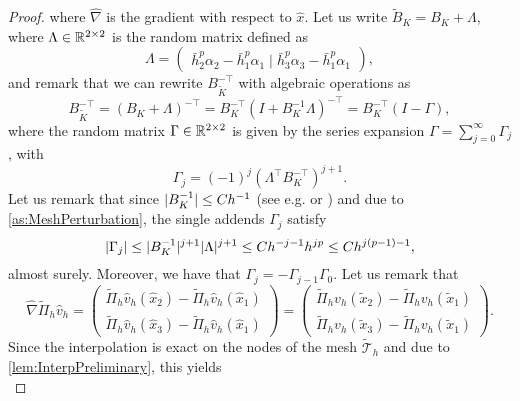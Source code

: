 \begin{proof}
where $\widehat \nabla$ is the gradient with respect to $\hat x$. Let us write $\widetilde B_K = B_K + \Lambda$, where $\Lambda \in \mathbb{R}^{2\times 2}$ is the random matrix defined as
\begin{equation}
	\Lambda = \begin{pmatrix} \bar h_2^p \alpha_2 - \bar h_1^p \alpha_1 \mid \bar h_3^p \alpha_3 - \bar h_1^p \alpha_1 \end{pmatrix},
\end{equation}
and remark that we can rewrite $B_{\widetilde K}^{-\top}$  with algebraic operations as
\begin{equation}
	B_{\widetilde K}^{-\top} = (B_K + \Lambda)^{-\top} = B_K^{-\top}(I + B_K^{-1}\Lambda)^{-\top} = B_K^{-\top}(I - \Gamma),
\end{equation}
where the random matrix $\Gamma\in \mathbb{R}^{2\times 2}$ is given by the series expansion $\Gamma = \sum_{j=0}^\infty \Gamma_j$, with
\begin{equation}
\Gamma_j = (-1)^j (\Lambda^\top B_K^{-\top})^{j+1}.
\end{equation} 
Let us remark that since $\lvert B_K^{-1}\rvert \leq Ch^{-1}$ (see e.g. \cite[Theorem 3.1.3]{Cia02} or \cite[Lemma 4.3]{Qua09}) and due to \cref{as:MeshPerturbation}, the single addends $\Gamma_j$ satisfy 
\begin{equation}
	\lvert\Gamma_j\rvert \leq \lvert B_K^{-1}\rvert^{j+1} \lvert\Lambda\rvert^{j+1} \leq C h^{-j-1} h^{jp} \leq Ch^{j(p-1)-1},
\end{equation}
almost surely. Moreover, we have that $\Gamma_j = -\Gamma_{j-1} \Gamma_0$. Let us remark that 
\begin{equation}
	\widehat\nabla \widetilde \Pi_h \widehat v_h = \begin{pmatrix} \widetilde \Pi_h \widehat v_h(\hat x_2) - \widetilde \Pi_h \widehat v_h(\hat x_1) \\
													 \widetilde \Pi_h \widehat v_h(\hat x_3) - \widetilde \Pi_h \widehat v_h(\hat x_1) \end{pmatrix}
								   = \begin{pmatrix} \widetilde \Pi_h v_h(\tilde x_2) - \widetilde \Pi_h v_h(\tilde x_1) \\
								   					 \widetilde \Pi_h v_h(\tilde x_3) - \widetilde \Pi_h v_h(\tilde x_1) \end{pmatrix}.
\end{equation}
Since the interpolation is exact on the nodes of the mesh $\widetilde{\mathcal T}_h$ and due to \cref{lem:InterpPreliminary}, this yields
\begin{equation}

\end{equation}
\end{proof}
